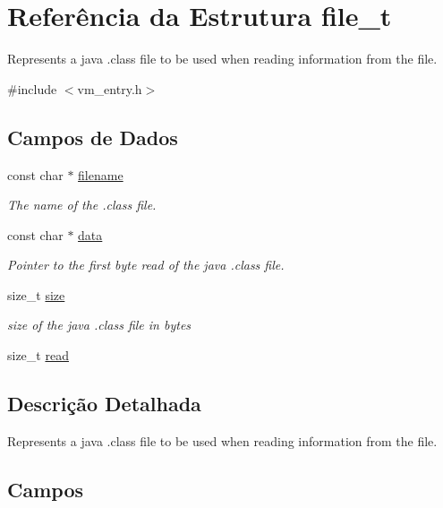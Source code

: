 \hypertarget{structfile__t}{}\section{Referência da Estrutura file\+\_\+t}
\label{structfile__t}


Represents a java .class file to be used when reading information from the file.  




{\ttfamily \#include $<$vm\+\_\+entry.\+h$>$}

\subsection*{Campos de Dados}
\begin{DoxyCompactItemize}
\item 
const char $\ast$ \hyperlink{structfile__t_a7efa5e9c7494c7d4586359300221aa5d}{filename}
\begin{DoxyCompactList}\small\item\em The name of the .class file. \end{DoxyCompactList}\item 
const char $\ast$ \hyperlink{structfile__t_a8f64897c7ccc5c13f276d1d07c4e7095}{data}
\begin{DoxyCompactList}\small\item\em Pointer to the first byte read of the java .class file. \end{DoxyCompactList}\item 
size\+\_\+t \hyperlink{structfile__t_a854352f53b148adc24983a58a1866d66}{size}
\begin{DoxyCompactList}\small\item\em size of the java .class file in bytes \end{DoxyCompactList}\item 
size\+\_\+t \hyperlink{structfile__t_a2f0fd670edc51b95ab1ede8473aecef3}{read}
\end{DoxyCompactItemize}


\subsection{Descrição Detalhada}
Represents a java .class file to be used when reading information from the file. 

\subsection{Campos}
\mbox{\label{structfile__t_a8f64897c7ccc5c13f276d1d07c4e7095}} 
